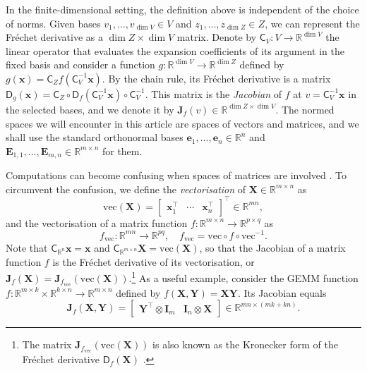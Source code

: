 \documentclass[namedate,webpdf,imanum]{ima-authoring-template}
\newcommand{\Real}{\mathbb{R}}
\newcommand{\Matrix}[1]{\mathbf{#1}}
\newcommand{\trans}{\intercal}
\newcommand{\krp}{\mathbin{\otimes}}
\newcommand{\vect}{\mathrm{vec}}
\newcommand{\Vect}[2][]{\vect#1( #2 #1)}
\newcommand{\Layer}[1]{\mathsf{#1}}
\numberwithin{equation}{section}
\begin{document}
In the finite-dimensional setting, the definition above is independent of the choice of norms.
Given bases $v_1, \ldots, v_{\dim V} \in V$ and $z_1, \ldots, z_{\dim Z} \in Z$, we can represent the Fr\'echet derivative as a $\dim Z \times \dim V$ matrix.
Denote by $\Layer{C}_V : V \to \Real^{\dim V}$ the linear operator that evaluates the expansion coefficients of its argument in the fixed basis and consider a function $g : \Real^{\dim V} \to \Real^{\dim Z}$ defined by $g(\Matrix{x}) = \Layer{C}_Z f(\Layer{C}_V^{-1} \Matrix{x})$.
By the chain rule, its Fr\'echet derivative is a matrix $\Layer{D}_g(\Matrix{x}) = \Layer{C}_Z \circ \Layer{D}_f(\Layer{C}_V^{-1} \Matrix{x}) \circ \Layer{C}_V^{-1}$.
This matrix is the \emph{Jacobian} of $f$ at $v = \Layer{C}_V^{-1} \Matrix{x}$ in the selected bases, and we denote it by $\Matrix{J}_f(v) \in \Real^{\dim Z \times \dim V}$.
The normed spaces we will encounter in this article are spaces of vectors and matrices, and we shall use the standard orthonormal bases $\Matrix{e}_1, \ldots, \Matrix{e}_n \in \Real^n$ and $\Matrix{E}_{1,1}, \ldots, \Matrix{E}_{m,n} \in \Real^{m \times n}$ for them.

Computations can become confusing when spaces of matrices are involved \citep{magnus2019matrix, magnus2024matrix}.
To circumvent the confusion, we define the \emph{vectorisation} of $\Matrix{X} \in \Real^{m \times n}$ as
\begin{equation*}
    \Vect{\Matrix{X}} = \begin{bmatrix}
        \Matrix{x}_1^\trans & \cdots & \Matrix{x}_n^\trans
    \end{bmatrix}^\trans \in \Real^{mn},
\end{equation*}
and the vectorisation of a matrix function $f : \Real^{m \times n} \to \Real^{p \times q}$ as
\begin{equation*}
    f_{\vect} : \Real^{mn} \to \Real^{pq}, \quad f_{\vect} = \vect \circ f \circ \vect^{-1}.
\end{equation*}
Note that $\Layer{C}_{\Real^n} \Matrix{x} = \Matrix{x}$ and $\Layer{C}_{\Real^{m \times n}} \Matrix{X} = \Vect{\Matrix{X}}$, so that the Jacobian of a matrix function $f$ is the Fr\'echet derivative of its vectorisation, or $\Matrix{J}_{f}(\Matrix{X}) = \Matrix{J}_{f_{\vect}}(\Vect{\Matrix{X}})$.\footnote{The matrix $\Matrix{J}_{f_{\vect}}(\Vect{\Matrix{X}})$ is also known as the Kronecker form of the Fr\'echet derivative $\Layer{D}_f(\Matrix{X})$ \cite[\S 3]{higham2008functions}.}
As a useful example, consider the GEMM function $f : \Real^{m \times k} \times \Real^{k \times n} \to \Real^{m \times n}$ defined by $f(\Matrix{X}, \Matrix{Y}) = \Matrix{X} \Matrix{Y}$.
Its Jacobian equals
\begin{equation*}
    \Matrix{J}_{f}(\Matrix{X}, \Matrix{Y}) = \begin{bmatrix}
        \Matrix{Y}^\trans \krp \Matrix{I}_m & \Matrix{I}_n \krp \Matrix{X}
    \end{bmatrix} \in \Real^{mn \times (mk + kn)}.
\end{equation*}
\end{document}

